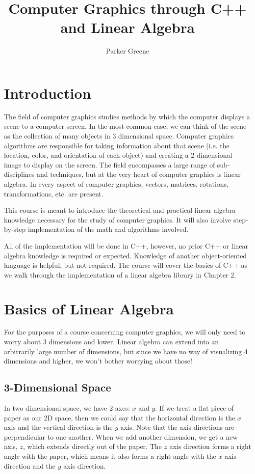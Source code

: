 \documentclass[a4paper]{article}
\title{Computer Graphics through C++ and Linear Algebra}
\author{Parker Greene}
\begin{document}
\maketitle

\section{Introduction}

The field of computer graphics studies methods by which the computer displays a scene to a computer screen. In the most common case, we can think of the scene as the collection of many objects in 3 dimensional space. Computer graphics algorithms are responsible for taking information about that scene (i.e. the location, color, and orientation of each object) and creating a 2 dimensional image to display on the screen. The field encompasses a large range of sub-disciplines and techniques, but at the very heart of computer graphics is linear algebra. In every aspect of computer graphics, vectors, matrices, rotations, transformations, etc. are present.

This course is meant to introduce the theoretical and practical linear algebra knowledge necessary for the study of computer graphics. It will also involve step-by-step implementation of the math and algorithms involved.

All of the implementation will be done in C++, however, no prior C++ or linear algebra knowledge is required or expected. Knowledge of another object-oriented language is helpful, but not required. The course will cover the basics of C++ as we walk through the implementation of a linear algebra library in Chapter 2.

\section{Basics of Linear Algebra}

For the purposes of a course concerning computer graphics, we will only need to worry about 3 dimensions and lower. Linear algebra can extend into an arbitrarily large number of dimensions, but since we have no way of visualizing 4 dimensions and higher, we won't bother worrying about those!

\subsection{3-Dimensional Space}

In two dimensional space, we have 2 axes: $x$ and $y$. If we treat a flat piece of paper as our 2D space, then we could say that the horizontal direction is the $x$ axis and the vertical direction is the $y$ axis. Note that the axis directions are perpendicular to one another. When we add another dimension, we get a new axis, $z$, which extends directly out of the paper. The $z$ axis direction forms a right angle with the paper, which means it also forms a right angle with the $x$ axis direction and the $y$ axis direction.
\end{document}
